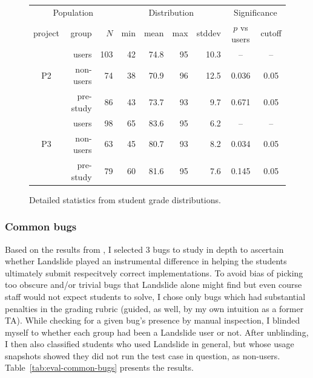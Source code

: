 \begin{figure}[t]
	\begin{center}
		\small
	\begin{tabular}{cr|r||r|r|r|r||cc}
		\multicolumn{3}{c||}{Population} & \multicolumn{4}{c||}{Distribution} & \multicolumn{2}{c}{Significance} \\
		project	& group		& $N$	& min	& mean	& max	& stddev & $p$ vs users	& cutoff\\
		\hline
			& users		& 103	& 42	& 74.8	& 95	& 10.3	& --	& --	\\
		P2	& non-users	& 74	& 38	& 70.9	& 96	& 12.5	& 0.036	& 0.05	\\
			& pre-study	& 86	& 43	& 73.7	& 93	& 9.7	& 0.671	& 0.05	\\
			\hline
			& users		& 98	& 65	& 83.6	& 95	& 6.2	& --	& --	\\
		P3	& non-users	& 63	& 45	& 80.7	& 93	& 8.2	& 0.034	& 0.05	\\
			& pre-study	& 79	& 60	& 81.6	& 95	& 7.6	& 0.145	& 0.05	\\
	\end{tabular}
	\end{center}
	\caption{Detailed statistics from student grade distributions.}
	\label{tab:table-of-ze-studence}
\end{figure}

\subsubsection{Common bugs}

Based on the results from \sect{\ref{sec:education-eval-bugfinding}},
I selected 3 bugs to study in depth to ascertain
whether Landslide played an instrumental difference
in helping the students ultimately submit respecitvely correct implementations.
To avoid bias of picking too obscure and/or trivial bugs
that Landslide alone might find but even course staff would not expect students to solve,
I chose only bugs which had substantial penalties in the grading rubric
(guided, as well, by my own intuition as a former TA).
While checking for a given bug's presence by manual inspection,
I blinded myself to whether each group had been a Landslide user or not.
After unblinding, I then also classified students who used Landslide in general,
but whose usage snapshots showed they did not run the test case in question,
as non-users.
Table~\ref{tab:eval-common-bugs} presents the results.

